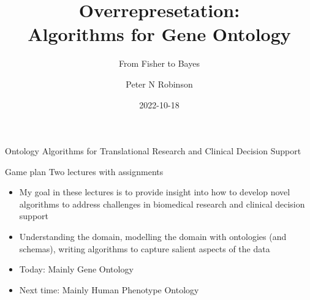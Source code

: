 \documentclass{beamer}
\title{Overrepresetation: \\ Algorithms for Gene Ontology}
\subtitle{From Fisher to Bayes}
\author{Peter N Robinson}
\institute{The Jackson Laboratory \\ Farmington CT}
\date{2022-10-18}
\begin{document}

\begin{frame}
	\maketitle %
\end{frame}


\begin{frame}{Ontology Algorithms for Translational Research and Clinical Decision Support}
 \begin{mybluebox}{Game plan}
 Two lectures with assignments
 \end{mybluebox}
 
 \begin{itemize}
 \item My goal in these lectures is to provide insight into how to develop novel algorithms to address challenges in biomedical research and clinical decision support
 \item Understanding the domain, modelling the domain with ontologies (and schemas), writing algorithms to capture salient aspects of the data
 \item Today: Mainly Gene Ontology
 \item Next time: Mainly Human Phenotype Ontology
 \end{itemize}

\end{frame}





\end{document}

